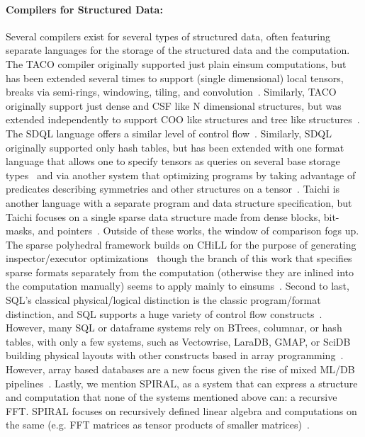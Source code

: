 \paragraph{ Compilers for Structured Data:}
Several compilers exist for several types of structured data, often featuring separate languages for the storage of the structured data and the computation.
%
The TACO compiler originally supported just plain einsum computations, but has been extended several times to support (single dimensional) local tensors, breaks via semi-rings, windowing, tiling, and convolution~\cite{kjolstad_tensor_2017, kjolstad_tensor_2019, senanayake2020sparse, henry_compilation_2021,won2023unified}.
%
Similarly, TACO originally support just dense and CSF like N dimensional structures, but was extended independently to support COO like structures and tree like structures~\cite{kjolstad_tensor_2017, chou2018format, chou2022compilation}.
%
The SDQL language offers a similar level of control flow~\cite{shaikhha2022functional}.
%
Similarly, SDQL originally supported only hash tables, but has been extended with one format language that allows one to specify tensors as queries on several base storage types~\cite{schleich2023optimizing} and via another system that optimizing programs by taking advantage of predicates describing symmetries and other structures on a tensor~\cite{ghorbani2023compiling}.
%
Taichi is another language with a separate program and data structure specification, but Taichi focuses on a single sparse data structure made from dense blocks, bit-masks, and pointers~\cite{hu_taichi_2019}.
%
Outside of these works, the window of comparison fogs up.
%
The sparse polyhedral framework builds on CHiLL for the purpose of generating inspector/executor optimizations~\cite{strout2018sparse} though the branch of this work that specifies sparse formats separately from the computation (otherwise they are inlined into the computation manually) seems to apply mainly to einsums~\cite{zhao2022polyhedral}.
%
Second to last, SQL's classical physical/logical distinction is the classic program/format distinction, and SQL supports a huge variety of control flow constructs~\cite{kotlyar1997relational, date1989guide}.
%
However, many SQL or dataframe systems rely on BTrees, columnar, or hash tables, with only a few systems, such as Vectowrise, LaraDB, GMAP, or SciDB building physical layouts with other constructs based in array programming~\cite{boncz2012vectorwise,hutchison2017laradb,  tsatalos1996gmap, stonebraker2013scidb}.
%
However, array based databases are a new focus given the rise of mixed ML/DB pipelines~\cite{baumann2021array,luo2018scalable}.
%
Lastly, we mention SPIRAL, as a system that can express a structure and computation that none of the systems mentioned above can: a recursive FFT. 
%
SPIRAL focuses on recursively defined linear algebra and computations on the same (e.g. FFT matrices as tensor products of smaller matrices)~\cite{franchetti2018spiral,franchetti2009operator}.
%

